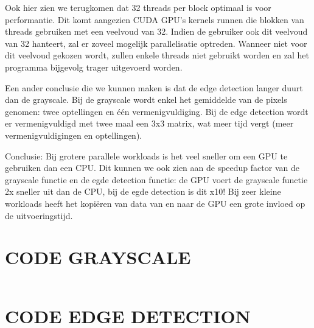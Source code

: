 \documentclass[11pt,twoside,a4paper]{article}
\begin{document}
Ook hier zien we terugkomen dat 32 threads per block optimaal is voor performantie. Dit komt aangezien CUDA GPU's kernels runnen die blokken van threads gebruiken met een veelvoud van 32. Indien de gebruiker ook dit veelvoud van 32 hanteert, zal er zoveel mogelijk parallelisatie optreden. Wanneer niet voor dit veelvoud gekozen wordt, zullen enkele threads niet gebruikt worden en zal het programma bijgevolg trager uitgevoerd worden.

Een ander conclusie die we kunnen maken is dat de edge detection langer duurt dan de grayscale. Bij de grayscale wordt enkel het gemiddelde van de pixels genomen: twee optellingen en \'e\'en vermenigvuldiging. Bij de edge detection wordt er vermenigvuldigd met twee maal een 3x3 matrix, wat meer tijd vergt (meer vermenigvuldigingen en optellingen).

Conclusie: Bij grotere parallele workloads is het veel sneller om een GPU te gebruiken dan een CPU. Dit kunnen we ook zien aan de speedup factor van de grayscale functie en de egde detection functie: de GPU voert de grayscale functie 2x sneller uit dan de CPU, bij de egde detection is dit x10! Bij zeer kleine workloads heeft het kopi\"eren van data van en naar de GPU een grote invloed op de uitvoeringstijd.


\newpage
\appendix


\section{CODE GRAYSCALE}\label{code_grayscale}
\inputminted[linenos=true, breaklines=true]{cuda}{main.cu}
\clearpage
\section{CODE EDGE DETECTION}\label{code_edge_detection}
\inputminted[linenos=true, breaklines=true]{cuda}{edge.cu}

\clearpage



\end{document}
